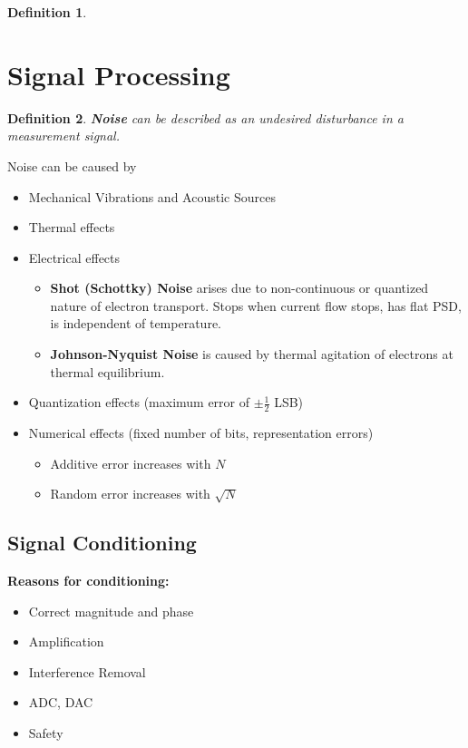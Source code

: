 \documentclass[10pt,a4paper]{scrartcl}
\newtheorem{define}{Definition}
\begin{document}
\begin{multicols*}{2}
\begin{define}
\end{define}


\section{Signal Processing}

\begin{define}
\textbf{Noise} can be described as an undesired disturbance in a measurement signal.
\end{define}

Noise can be caused by
\begin{itemize}
\item Mechanical Vibrations and Acoustic Sources
\item Thermal effects
\item Electrical effects
\begin{itemize}
\item \textbf{Shot (Schottky) Noise} arises due to non-continuous or quantized nature of electron transport. Stops when current flow stops, has flat PSD, is independent of temperature.

\item \textbf{Johnson-Nyquist Noise} is caused by thermal agitation of electrons at thermal equilibrium.
\end{itemize}
\item Quantization effects (maximum error of $\pm \frac{1}{2}$ LSB)
\item Numerical effects (fixed number of bits, representation errors)
\begin{itemize}
\item Additive error increases with $N$
\item Random error increases with $\sqrt{N}$
\end{itemize}
\end{itemize}

\subsection{Signal Conditioning}

\textbf{Reasons for conditioning:}
\begin{itemize}
\item Correct magnitude and phase
\item Amplification
\item Interference Removal
\item ADC, DAC
\item Safety
\end{itemize}


\end{multicols*}
\end{document}
